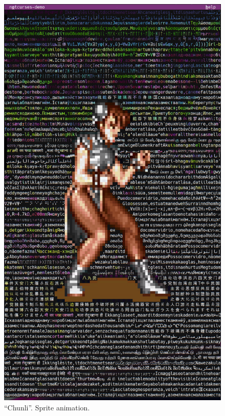 \documentclass[letterpaper,10pt]{article}
\begin{document}
\begin{figure}
  \centering \includegraphics[width=.75\linewidth]{media/demo-chunli1.png}
  \caption{``Chunli''. Sprite animation.}
\end{figure}
\end{document}
